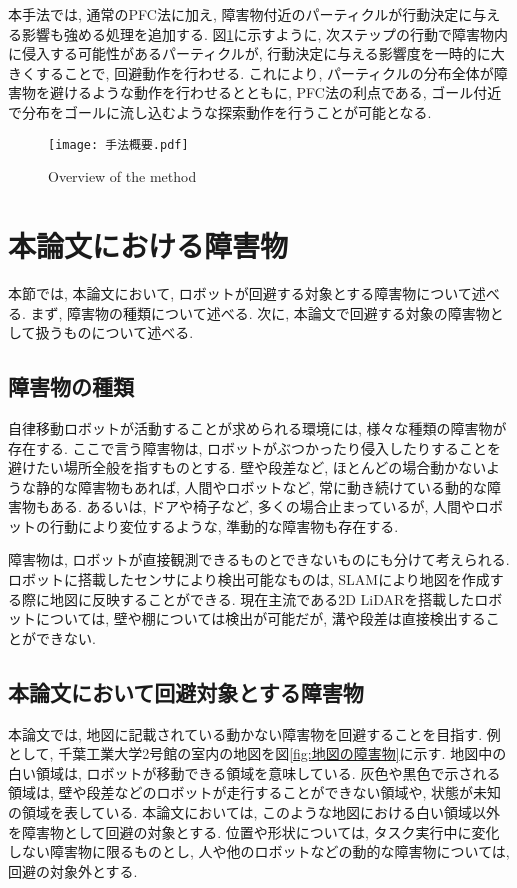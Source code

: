 本手法では, 通常のPFC法に加え, 障害物付近のパーティクルが行動決定に与える影響も強める処理を追加する. 
図\ref{fig:手法概要}に示すように, 次ステップの行動で障害物内に侵入する可能性があるパーティクルが, 
行動決定に与える影響度を一時的に大きくすることで, 回避動作を行わせる. 
これにより, パーティクルの分布全体が障害物を避けるような動作を行わせるとともに, 
PFC法の利点である, ゴール付近で分布をゴールに流し込むような探索動作を行うことが可能となる. 

\begin{figure}[H]
  \begin{center}
    \texttt{[image: 手法概要.pdf]}
    \caption{Overview of the method}
    \label{fig:手法概要}
  \end{center}
\end{figure}


\section{本論文における障害物} \label{section:障害物}
本節では, 本論文において, ロボットが回避する対象とする障害物について述べる. 
まず, 障害物の種類について述べる. 
次に, 本論文で回避する対象の障害物として扱うものについて述べる. 

\subsection{障害物の種類}
自律移動ロボットが活動することが求められる環境には, 様々な種類の障害物が存在する. 
ここで言う障害物は, ロボットがぶつかったり侵入したりすることを避けたい場所全般を指すものとする. 
壁や段差など, ほとんどの場合動かないような静的な障害物もあれば, 
人間やロボットなど, 常に動き続けている動的な障害物もある. 
あるいは, ドアや椅子など, 多くの場合止まっているが, 人間やロボットの行動により変位するような, 準動的な障害物も存在する. 

障害物は, ロボットが直接観測できるものとできないものにも分けて考えられる. 
ロボットに搭載したセンサにより検出可能なものは, SLAMにより地図を作成する際に地図に反映することができる. 
現在主流である2D LiDARを搭載したロボットについては, 壁や棚については検出が可能だが, 溝や段差は直接検出することができない. 

\subsection{本論文において回避対象とする障害物}
本論文では, 地図に記載されている動かない障害物を回避することを目指す. 
例として, 千葉工業大学2号館の室内の地図を図\ref{fig:地図の障害物}に示す. 
地図中の白い領域は, ロボットが移動できる領域を意味している. 
灰色や黒色で示される領域は, 壁や段差などのロボットが走行することができない領域や, 
状態が未知の領域を表している. 
本論文においては, このような地図における白い領域以外を障害物として回避の対象とする. 
位置や形状については, タスク実行中に変化しない障害物に限るものとし, 
人や他のロボットなどの動的な障害物については, 回避の対象外とする. 

